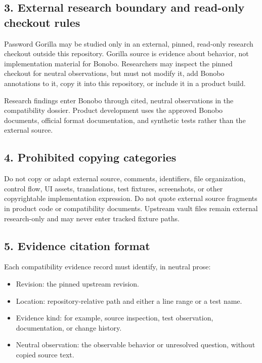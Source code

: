 \documentclass[
  letterpaper,
]{article}
\providecommand{\tightlist}{%
  \setlength{\itemsep}{0pt}\setlength{\parskip}{0pt}}
\begin{document}
\subsection{3. External research boundary and read-only checkout
rules}\label{3-external-research-boundary-and-read-only-checkout-rules}

Password Gorilla may be studied only in an external, pinned, read-only research checkout outside this repository.
Gorilla source is evidence about behavior, not implementation material for Bonobo. Researchers may inspect the pinned
checkout for neutral observations, but must not modify it, add Bonobo annotations to it, copy it into this repository,
or include it in a product build.

Research findings enter Bonobo through cited, neutral observations in the compatibility dossier. Product development
uses the approved Bonobo documents, official format documentation, and synthetic tests rather than the external source.

\subsection{4. Prohibited copying categories}\label{4-prohibited-copying-categories}

Do not copy or adapt external source, comments, identifiers, file organization, control flow, UI assets, translations,
test fixtures, screenshots, or other copyrightable implementation expression. Do not quote external source fragments in
product code or compatibility documents. Upstream vault files remain external research-only and may never enter tracked
fixture paths.

\subsection{5. Evidence citation format}\label{5-evidence-citation-format}

Each compatibility evidence record must identify, in neutral prose:

\begin{itemize}
\tightlist
\item
  Revision: the pinned upstream revision.
\item
  Location: repository-relative path and either a line range or a test name.
\item
  Evidence kind: for example, source inspection, test observation, documentation, or change history.
\item
  Neutral observation: the observable behavior or unresolved question, without copied source text.
\end{itemize}
\end{document}
